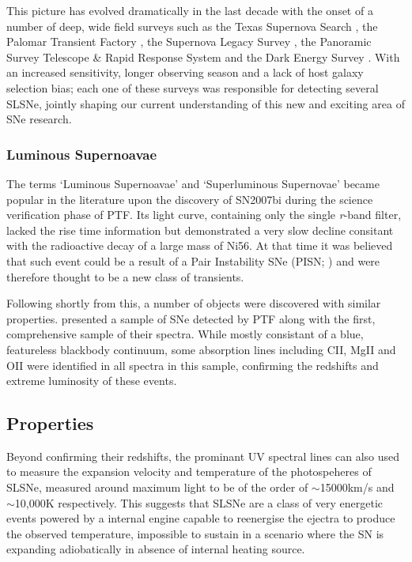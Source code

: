 This picture has evolved dramatically in the last decade with the onset of a number of deep, wide field surveys such as the Texas Supernova Search \citep[TSS;][]{Quimby2006}, the Palomar Transient Factory \citep[PTF;][]{Law2009, Rau2009}, the Supernova Legacy Survey \citep[SNLS;][]{Astier2005,Guy2010,Perrett2010}, the Panoramic Survey Telescope \& Rapid Response System \citep[Pan-STARRS;][]{Kaiser2010} and the Dark Energy Survey \citep[DES;][]{Flaugher2005}. With an increased sensitivity, longer observing season and a lack of host galaxy selection bias; each one of these surveys was responsible for detecting several SLSNe, jointly shaping our current understanding of this new and exciting area of SNe research.

\subsubsection{Luminous Supernoavae}
The terms `Luminous Supernoavae' and `Superluminous Supernovae' became popular in the literature upon the discovery of SN2007bi \citep{Gal-Yam2009} during the science verification phase of PTF. Its light curve, containing only the single \textit{r}-band filter, lacked the rise time information but demonstrated a very slow decline consitant with the radioactive decay of a large mass of Ni56. At that time it was believed that such event could be a result of a Pair Instability SNe (PISN; ) and were therefore thought to be a new class of transients.

Following shortly from this, a number of objects were discovered with similar properties. \citet{Quimby2009} presented a sample of SNe detected by PTF along with the first, comprehensive sample of their spectra. While mostly consistant of a blue, featureless blackbody continuum, some absorption lines including CII, MgII and OII \citep[see ][for more recent line identification]{Mazzali2015} were identified in all spectra in this sample, confirming the redshifts and extreme luminosity of these events.

\subsection{Properties}
Beyond confirming their redshifts, the prominant UV spectral lines can also used to measure the expansion velocity and temperature of the photospeheres of SLSNe, measured around maximum light to be of the order of $\sim$15000km/s and $\sim$10,000K respectively. This suggests that SLSNe are a class of very energetic events powered by a internal engine capable to reenergise the ejectra to produce the observed temperature, impossible to sustain in a scenario where the SN is expanding adiobatically in absence of internal heating source.

